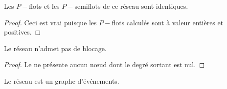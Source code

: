\begin{rmq}
    Les $P-$flots et les $P-$semiflots de ce réseau sont identiques.
\end{rmq}

\begin{proof}
    Ceci est vrai puisque les $P-$flots calculés sont à valeur entières et positives.
\end{proof}

\begin{thrm}
    Le réseau n'admet pas de blocage.
\end{thrm}

\begin{proof}
    Le \gma ne présente aucun n\oe ud dont le degré sortant est nul.
\end{proof}

\begin{thrm}
    Le réseau est un graphe d'événements.
\end{thrm}

